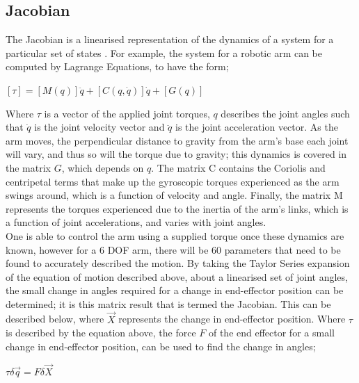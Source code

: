 \documentclass[12pt,openany,a4paper]{book}
\begin{document}
\subsection{Jacobian}
The Jacobian is a linearised representation of the dynamics of a system for a particular set of states \cite{robotacademy2}. For example, the system for a robotic arm can be computed by Lagrange Equations, to have the form;

\vspace{\baselineskip}
\begin{center}
$[\tau] = [M(q)] \ddot{q} + [ C (q, \dot{q} ) ] \dot{q} + [G(q)]$
\end{center}

\vspace{\baselineskip}
Where $\tau$ is a vector of the applied joint torques, $q$ describes the joint angles such that $\dot{q}$ is the joint velocity vector and $\ddot{q}$ is the joint acceleration vector. As the arm moves, the perpendicular distance to gravity from the arm's base each joint will vary, and thus so will the torque due to gravity; this dynamics is covered in the matrix $G$, which depends on $q$. The matrix C contains the Coriolis and centripetal terms that make up the gyroscopic torques experienced as the arm swings around, which is a function of velocity and angle. Finally, the matrix M represents the torques experienced due to the inertia of the arm's links, which is a function of joint accelerations, and varies with joint angles.\\
One is able to control the arm using a supplied torque once these dynamics are known, however for a 6 DOF arm, there will be 60 parameters that need to be found to accurately described the motion. By taking the Taylor Series expansion of the equation of motion described above, about a linearised set of joint angles, the small change in angles required for a change in end-effector position can be determined; it is this matrix result that is termed the Jacobian. This can be described below, where $\vec{X}$ represents the change in end-effector position. Where $\tau$ is described by the equation above, the force $F$ of the end effector for a small change in end-effector position, can be used to find the change in angles;

\vspace{\baselineskip}
\begin{center}
$\tau \delta \vec{q} = F \delta	\vec{X}$
\end{center}
\end{document}
